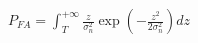 \documentclass[preview]{standalone}
\begin{document}
\begin{align*}
P_{FA} = \int_{T}^{+\infty} \frac{z}{\sigma^{2}_{n}} \exp{\left( - \frac{z^2}{2 \sigma^{2}_{n}} \right) dz}
\end{align*}
\end{document}
